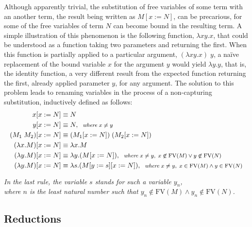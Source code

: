 \documentclass[table, a4paper, 10pt]{book}
\begin{document}
Although apparently trivial, the substitution of free variables of some term with an another term,
the result being written as $M[x := N]$, can be precarious, for some of the 
free variables of term $N$ can become bound in the resulting term. A simple illustration of this
phenomenon is the following function, $\lambda xy.x$, that could be understood as a function
taking two parameters and returning the first. When this function is partially
applied to a particular argument, $(\lambda xy.x)\;y$, a na\"ive replacement of 
the bound variable $x$ for the argument $y$ would yield
$\lambda y.y$, that is, the identity function, a very different result from the expected function returning
the first, already applied parameter $y$, for any argument. The solution to this problem leads
to renaming variables in the process of a non-capturing substitution, inductively defined as follows:
\begin{align*}
\vspace{1cm}x[x := N] &\equiv N\\
\vspace{1cm}y[x := N] &\equiv N,\;\;\text{\footnotesize\textit{where}$\;x \not= y$}\\
\vspace{1cm}(M_1\;M_2)[x := N] &\equiv (M_1[x := N])\;(M_2[x := N])\\
\vspace{1cm}(\lambda x.M)[x := N] &\equiv \lambda x.M\\
\vspace{1cm}(\lambda y.M)[x := N] &\equiv \lambda y.(M[x := N]),\;\;\text{\footnotesize\textit{where}$\;x \not= y,\;x \not\in \mathrm{FV}(M) \lor y \not\in \mathrm{FV}(N)$}\\
\vspace{1cm}(\lambda y.M)[x := N] &\equiv \lambda s.(M[y := s][x := N]),\;\;\text{\footnotesize\textit{where}$\;x \not= y,\;x\in \mathrm{FV}(M) \land y \in \mathrm{FV}(N)$}
\end{align*}
\begin{center}\footnotesize
\textit{In the last rule, the variable $s$ stands for such a variable $y_n$,
\\where $n$ is the least natural number such that $y_n \not\in \mathrm{FV}(M) \land y_n \not\in \mathrm{FV}(N)$.}
\end{center}

\subsection{Reductions}\label{sec:red}
\end{document}
